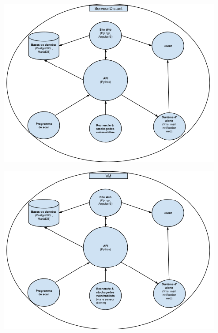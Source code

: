 \begin{figure}
  \includegraphics[width=18cm]{serveur-distant.png}
\end{figure}

\begin{figure}
  \includegraphics[width=18cm]{vm.png}
\end{figure}